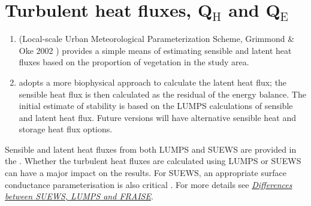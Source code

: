 \documentclass[letterpaper,10pt,english]{sphinxmanual}
\begin{document}
\section{Turbulent heat fluxes, Q$_{\text{H}}$ and Q$_{\text{E}}$}
\label{\detokenize{parameterisations-and-sub-models:turbulent-heat-fluxes-qh-and-qe}}\begin{enumerate}
\item {} 
 (Local-scale Urban Meteorological Parameterization Scheme,
Grimmond \& Oke 2002 \label{\detokenize{parameterisations-and-sub-models:id13}}{\hyperref[\detokenize{references:go2002}]{\sphinxcrossref{{[}GO2002{]}}}}) provides a simple means of estimating
sensible and latent heat fluxes based on the proportion of vegetation
in the study area.

\item {} 
 adopts a more biophysical approach to calculate the latent
heat flux; the sensible heat flux is then calculated as the residual
of the energy balance. The initial estimate of stability is based on
the LUMPS calculations of sensible and latent heat flux. Future
versions will have alternative sensible heat and storage heat flux
options.

\end{enumerate}

Sensible and latent heat fluxes from both LUMPS and SUEWS are provided
in the {\hyperref[\detokenize{output-files:output-files}]{}}. Whether the turbulent heat
fluxes are calculated using LUMPS or SUEWS can have a major impact on
the results. For SUEWS, an appropriate surface conductance
parameterisation is also critical \label{\detokenize{parameterisations-and-sub-models:id14}}{\hyperref[\detokenize{references:j11}]{\sphinxcrossref{{[}J11{]}}}} \label{\detokenize{parameterisations-and-sub-models:id15}}{\hyperref[\detokenize{references:w16}]{\sphinxcrossref{{[}W16{]}}}}. For more details see
{\hyperref[\detokenize{parameterisations-and-sub-models:Differences_between_SUEWS,_LUMPS_and_FRAISE}]{\emph{Differences between SUEWS, LUMPS and
FRAISE}}}.
\end{document}
